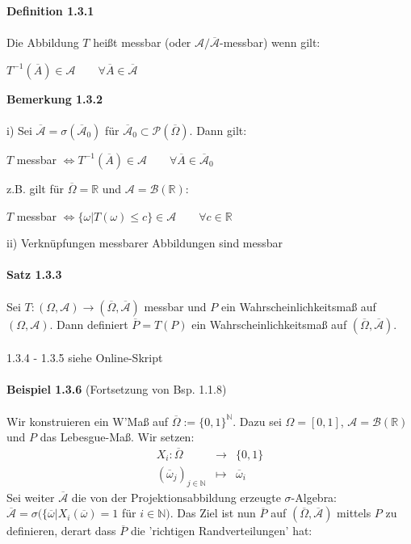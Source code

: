 \documentclass[10pt,a4paper]{report}
\numberwithin{equation}{section}
\numberwithin{figure}{section}
\theoremstyle{plain}
\theoremstyle{definition}
\theoremstyle{plain}
\theoremstyle{definition}
\theoremstyle{remark}
\theoremstyle{plain}
\begin{document}
\textbf{Definition 1.3.1}\\\\
Die Abbildung $T$ heißt messbar (oder $\mathcal{A}/\overline{\mathcal{A}}$-messbar) wenn gilt:
\begin{center}
$T^{-1}(\overline{A}) \in \mathcal{A} \qquad \forall \overline{A} \in \overline{\mathcal{A}}$
\end{center}
\textbf{Bemerkung 1.3.2}\\\\
i) Sei $\overline{\mathcal{A}}=\sigma(\overline{\mathcal{A}}_0)$ für $\overline{\mathcal{A}}_0 \subset \mathcal{P}(\overline{\Omega})$. Dann gilt:
\begin{center}
$T$ messbar $\Leftrightarrow T^{-1}(\overline{A}) \in \mathcal{A} \qquad \forall \overline{A} \in \overline{\mathcal{A}}_0$ 
\end{center}
z.B. gilt für $\overline{\Omega}=\mathbb{R}$ und $\mathcal{A}=\mathcal{B}(\mathbb{R})$:
\begin{center}
$T$ messbar $\Leftrightarrow \{\omega|T(\omega)\leq c\} \in \mathcal{A} \qquad \forall c \in \mathbb{R}$
\end{center}
ii) Verknüpfungen messbarer Abbildungen sind messbar\\\\
\textbf{Satz 1.3.3}\\\\
Sei $T:(\Omega, \mathcal{A})\to(\overline{\Omega},\overline{\mathcal{A}})$ messbar und $P$ ein Wahrscheinlichkeitsmaß auf $(\Omega, \mathcal{A})$. Dann definiert $\overline{P}=T(P)$ ein Wahrscheinlichkeitsmaß auf $(\overline{\Omega},\overline{\mathcal{A}})$.\\\\
1.3.4 - 1.3.5 siehe Online-Skript\\\\
\textbf{Beispiel 1.3.6} (Fortsetzung von Bsp. 1.1.8)\\\\
Wir konstruieren ein W'Maß auf $\overline{\Omega}:=\{0,1\}^\mathbb{N}$. Dazu sei $\Omega=[0,1]$, $\mathcal{A}=\mathcal{B}(\mathbb{R})$ und $P$ das Lebesgue-Maß. Wir setzen:
\begin{eqnarray*}
X_i:\overline{\Omega} &\to & \{0,1\}\\
(\overline{\omega}_j)_{j \in \mathbb{N}} &\mapsto & \overline{\omega}_i
\end{eqnarray*}
Sei weiter $\overline{\mathcal{A}}$ die von der Projektionsabbildung erzeugte $\sigma$-Algebra: $\overline{\mathcal{A}}=\sigma(\{\overline{\omega}|X_i(\overline{\omega})=1$ für $i\in \mathbb{N})$. Das Ziel ist nun $\overline{P}$ auf $(\overline{\Omega},\overline{\mathcal{A}})$ mittels $P$ zu definieren, derart dass $\overline{P}$ die 'richtigen Randverteilungen' hat:
\end{document}
